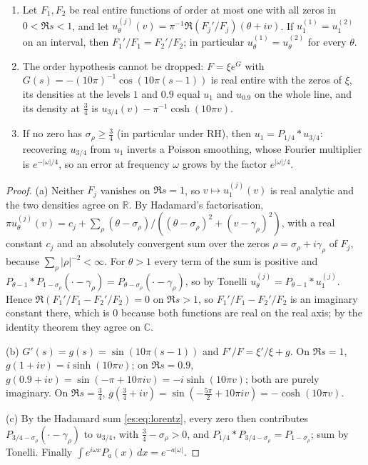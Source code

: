 \begin{proposition}\label{cf:prop:determine}
\begin{enumerate}
\item[(a)] Let $F_1,F_2$ be real entire functions of order at most one with all zeros in $0<\Re s<1$, and let $u^{(j)}_\theta(v)=\pi^{-1}\Re(F_j'/F_j)(\theta+iv)$. If $u^{(1)}_1=u^{(2)}_1$ on an interval, then $F_1'/F_1=F_2'/F_2$; in particular $u^{(1)}_\theta=u^{(2)}_\theta$ for every $\theta$.
\item[(b)] The order hypothesis cannot be dropped: $F=\xi e^{G}$ with $G(s)=-(10\pi)^{-1}\cos(10\pi(s-1))$ is real entire with the zeros of $\xi$, its densities at the levels $1$ and $0.9$ equal $u_1$ and $u_{0.9}$ on the whole line, and its density at $\frac34$ is $u_{3/4}(v)-\pi^{-1}\cosh(10\pi v)$.
\item[(c)] If no zero has $\sigma_\rho\ge\frac34$ (in particular under RH), then $u_1=P_{1/4}*u_{3/4}$: recovering $u_{3/4}$ from $u_1$ inverts a Poisson smoothing, whose Fourier multiplier is $e^{-\lvert\omega\rvert/4}$, so an error at frequency $\omega$ grows by the factor $e^{\lvert\omega\rvert/4}$.
\end{enumerate}
\end{proposition}

\begin{proof}
(a) Neither $F_j$ vanishes on $\Re s=1$, so $v\mapsto u^{(j)}_1(v)$ is real analytic and the two densities agree on $\mathbb R$. By Hadamard's factorisation, $\pi u^{(j)}_\theta(v)=c_j+\sum_\rho(\theta-\sigma_\rho)/((\theta-\sigma_\rho)^2+(v-\gamma_\rho)^2)$, with a real constant $c_j$ and an absolutely convergent sum over the zeros $\rho=\sigma_\rho+i\gamma_\rho$ of $F_j$, because $\sum_\rho\lvert\rho\rvert^{-2}<\infty$. For $\theta>1$ every term of the sum is positive and $P_{\theta-1}*P_{1-\sigma_\rho}(\cdot-\gamma_\rho)=P_{\theta-\sigma_\rho}(\cdot-\gamma_\rho)$, so by Tonelli $u^{(j)}_\theta=P_{\theta-1}*u^{(j)}_1$. Hence $\Re(F_1'/F_1-F_2'/F_2)=0$ on $\Re s>1$, so $F_1'/F_1-F_2'/F_2$ is an imaginary constant there, which is $0$ because both functions are real on the real axis; by the identity theorem they agree on $\mathbb C$.

(b) $G'(s)=g(s)=\sin(10\pi(s-1))$ and $F'/F=\xi'/\xi+g$. On $\Re s=1$, $g(1+iv)=i\sinh(10\pi v)$; on $\Re s=0.9$, $g(0.9+iv)=\sin(-\pi+10\pi iv)=-i\sinh(10\pi v)$; both are purely imaginary. On $\Re s=\frac34$, $g(\frac34+iv)=\sin(-\frac{5\pi}2+10\pi iv)=-\cosh(10\pi v)$.

(c) By the Hadamard sum \eqref{es:eq:lorentz}, every zero then contributes $P_{3/4-\sigma_\rho}(\cdot-\gamma_\rho)$ to $u_{3/4}$, with $\frac34-\sigma_\rho>0$, and $P_{1/4}*P_{3/4-\sigma_\rho}=P_{1-\sigma_\rho}$; sum by Tonelli. Finally $\int e^{i\omega x}P_a(x)\,dx=e^{-a\lvert\omega\rvert}$.
\end{proof}
